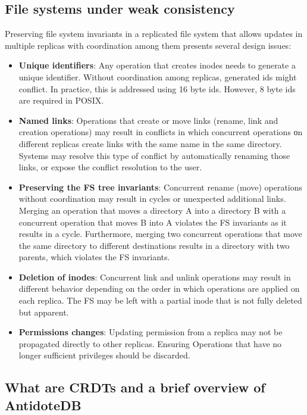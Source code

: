 \documentclass[sigconf,anonymous,10pt]{acmart}
\begin{document}
\subsection{File systems under weak consistency}
\label{fs:weak}

Preserving file system invariants in a replicated file system
that allows updates in multiple replicas with coordination
among them presents several design issues:

\begin{itemize}
	\item \textbf{Unique identifiers}: Any operation that creates
	inodes needs to generate a unique identifier.
	Without coordination among replicas, generated ids might conflict.
	In practice, this is addressed using 16 byte ids.
	However, 8 byte ids are required in POSIX.
	\item \textbf{Named links}: Operations that create or move links
	(rename, link and creation operations) may result in conflicts
	in which concurrent operations οn different replicas create
	links with the same name in the same directory.
	Systems may resolve this type of conflict by automatically
	renaming those links, or expose the conflict resolution to the user.
	\item \textbf{Preserving the FS tree invariants}: Concurrent rename (move)
	operations without coordination may result in cycles or unexpected
	additional links. Merging an operation that moves a directory A into a
	directory B with a concurrent operation that moves B into A violates the
	FS invariants as it results in a cycle.
	Furthermore, merging two concurrent operations that move the same directory
	to different destinations results in a directory with two parents,
	which violates the FS invariants.
	\item \textbf{Deletion of inodes}: Concurrent link and unlink operations may result in different behavior depending on the order in which operations are applied on each replica. The FS may be left with a partial inode that is not fully deleted but apparent.
	\item \textbf{Permissions changes}: Updating permission from a replica may not be propagated directly to other replicas. Ensuring Operations that have no longer sufficient privileges should be discarded.
\end{itemize}

\subsection{What are CRDTs and a brief overview of AntidoteDB}
\end{document}
